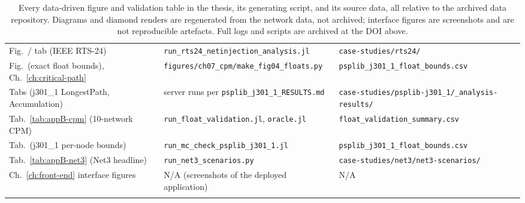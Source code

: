 \documentclass[12pt]{report}
\providecommand{\filepath}[1]{\nolinkurl{#1}}
\begin{document}
{\begin{longtable}{@{}p{4.2cm} p{4.7cm} p{4.2cm}@{}}
Fig.\ / tab (IEEE RTS-24) & \filepath{run_rts24_netinjection_analysis.jl} & \filepath{case-studies/rts24/} \\
Fig.\ (exact float bounds), Ch.~\ref{ch:critical-path} & \filepath{figures/ch07\_cpm/make\_fig04\_floats.py} & \filepath{psplib_j301_1_float_bounds.csv} \\
Tabs (j301\_1 LongestPath, Accumulation) & server runs per \filepath{psplib_j301_1_RESULTS.md} & \filepath{case-studies/psplib-j301\_1/\_analysis-results/} \\
Tab.~\ref{tab:appB-cpm} (10-network CPM) & \filepath{run_float_validation.jl}, \filepath{oracle.jl} & \filepath{float_validation_summary.csv} \\
Tab.\ (j301\_1 per-node bounds) & \filepath{run_mc_check_psplib_j301_1.jl} & \filepath{psplib_j301_1_float_bounds.csv} \\
Tab.~\ref{tab:appB-net3} (Net3 headline) & \filepath{run_net3_scenarios.py} & \filepath{case-studies/net3/net3-scenarios/} \\
Ch.~\ref{ch:front-end} interface figures & N/A (screenshots of the deployed application) & N/A \\
\bottomrule
\caption{Every data-driven figure and validation table in the thesis, its generating
script, and its source data, all relative to the archived data repository. Diagrams and
diamond renders are regenerated from the network data, not archived; interface figures are
screenshots and are not reproducible artefacts. Full logs and scripts are archived at the
DOI above.}
\label{tab:appB-map}
\end{longtable}}

\ifdefined\maindoc
\else
\printbibliography
\end{document}

